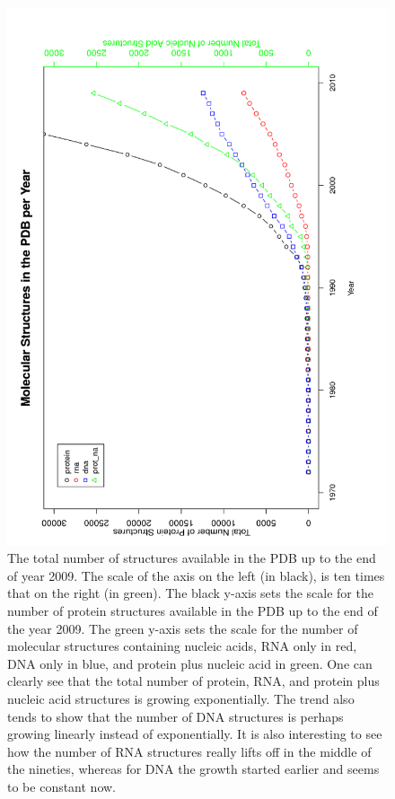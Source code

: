\begin{figure}
\centering
\includegraphics[angle=0, scale=0.3]{Chapter2/allmolecules_per_year.png}
\caption{The total number of structures available in the PDB up to the
  end of year 2009.  The scale of  the axis on the left (in black), is
  ten times  that on the right  (in green). The black  y-axis sets the
  scale for the  number of protein structures available  in the PDB up
  to the end of the year 2009. The green y-axis sets the scale for the
  number of molecular structures containing nucleic acids, RNA only in
  red, DNA only in blue, and  protein plus nucleic acid in green.  One
  can clearly see  that the total number of  protein, RNA, and protein
  plus  nucleic acid  structures is  growing exponentially.  The trend
  also  tends to show  that the  number of  DNA structures  is perhaps
  growing linearly  instead of exponentially.  It  is also interesting
  to see  how the  number of  RNA structures really  lifts off  in the
  middle of the  nineties, whereas for DNA the  growth started earlier
  and seems to be constant now.}
\label{fig:allpolypdb}
\end{figure}

